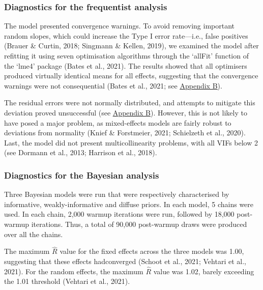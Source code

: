 \documentclass[
  12pt,
  man,floatsintext]{apa7}
\begin{document}
\hypertarget{diagnostics-for-the-frequentist-analysis-3}{%
\subsubsection{Diagnostics for the frequentist analysis}\label{diagnostics-for-the-frequentist-analysis-3}}

The model presented convergence warnings. To avoid removing important random slopes, which could increase the Type I error rate---i.e., false positives (Brauer \& Curtin, 2018; Singmann \& Kellen, 2019), we examined the model after refitting it using seven optimisation algorithms through the `allFit' function of the `lme4' package (Bates et al., 2021). The results showed that all optimisers produced virtually identical means for all effects, suggesting that the convergence warnings were not consequential (Bates et al., 2021; see \protect\hyperlink{appendix-B-frequentist-analysis-diagnostics}{\underline{Appendix B}}).

The residual errors were not normally distributed, and attempts to mitigate this deviation proved unsuccessful (see \protect\hyperlink{appendix-B-frequentist-analysis-diagnostics}{\underline{Appendix B}}). However, this is not likely to have posed a major problem, as mixed-effects models are fairly robust to deviations from normality (Knief \& Forstmeier, 2021; Schielzeth et al., 2020). Last, the model did not present multicollinearity problems, with all VIFs below 2 (see Dormann et al., 2013; Harrison et al., 2018).

\hypertarget{diagnostics-for-the-bayesian-analysis-2}{%
\subsubsection{Diagnostics for the Bayesian analysis}\label{diagnostics-for-the-bayesian-analysis-2}}

Three Bayesian models were run that were respectively characterised by informative, weakly-informative and diffuse priors. In each model, 5 chains were used. In each chain, 2,000 warmup iterations were run, followed by 18,000 post-warmup iterations. Thus, a total of 90,000 post-warmup draws were produced over all the chains.

The maximum \(\widehat R\) value for the fixed effects across the three models was 1.00, suggesting that these effects hadconverged (Schoot et al., 2021; Vehtari et al., 2021). For the random effects, the maximum \(\widehat R\) value was 1.02, barely exceeding the 1.01 threshold (Vehtari et al., 2021).
\end{document}
